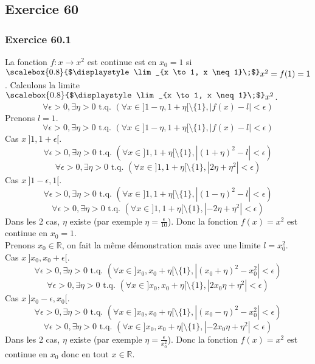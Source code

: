 \documentclass[]{book}
\theoremstyle{definition}
\newcommand{\bb}[1]{\mathbb{#1}}
\newcommand{\R}{\bb{R}}
\begin{document}
\subsection*{Exercice 60}
\subsubsection*{Exercice 60.1}
La fonction $f: x \to x^2$ est continue est en $x_0 = 1$ si $\raisebox{0.5ex}{\scalebox{0.8}{$\displaystyle \lim_{x \to 1, x \neq 1}\;$}} x^2 = f(1) = 1$.
Calculons la limite $\raisebox{0.5ex}{\scalebox{0.8}{$\displaystyle \lim_{x \to 1, x \neq 1}\;$}} x^2$.\\
$$\forall \epsilon >0, \exists \eta > 0 \textrm{ t.q. } ( \forall x \in ]1-\eta, 1+\eta[ \setminus \{1\}, |f(x)-l| <\epsilon)$$
Prenons $l=1$.
$$\forall \epsilon >0, \exists \eta > 0 \textrm{ t.q. } ( \forall x \in ]1-\eta, 1+\eta[ \setminus \{1\}, |f(x)-l| <\epsilon)$$
Cas $x \ ]1,1+\epsilon[$.
$$\forall \epsilon >0, \exists \eta > 0 \textrm{ t.q. } ( \forall x \in ]1, 1+\eta[ \setminus \{1\}, |(1+\eta)^2-l| <\epsilon)$$
$$\forall \epsilon >0, \exists \eta > 0 \textrm{ t.q. } ( \forall x \in ]1, 1+\eta[ \setminus \{1\}, |2\eta+\eta^2| <\epsilon)$$
Cas $x \ ]1-\epsilon,1[$.
$$\forall \epsilon >0, \exists \eta > 0 \textrm{ t.q. } ( \forall x \in ]1, 1+\eta[ \setminus \{1\}, |(1-\eta)^2-l| <\epsilon)$$
$$\forall \epsilon >0, \exists \eta > 0 \textrm{ t.q. } ( \forall x \in ]1, 1+\eta[ \setminus \{1\}, |-2\eta+\eta^2| <\epsilon)$$
Dans les 2 cas, $\eta$ existe (par exemple $\eta = \frac{\epsilon}{10}$). Donc la fonction $f(x)=x^2$ est continue en $x_0=1$.\\

Prenons $x_0 \in \R$, on fait la m\^eme d\'emonstration mais avec une limite $l=x_0^2$.\\ 
Cas $x \ ]x_0,x_0+\epsilon[$.
$$\forall \epsilon >0, \exists \eta > 0 \textrm{ t.q. } ( \forall x \in ]x_0, x_0+\eta[ \setminus \{1\}, |(x_0+\eta)^2-x_0^2| <\epsilon)$$
$$\forall \epsilon >0, \exists \eta > 0 \textrm{ t.q. } ( \forall x \in ]x_0, x_0+\eta[ \setminus \{1\}, |2x_0\eta+\eta^2| <\epsilon)$$
Cas $x \ ]x_0-\epsilon,x_0[$.
$$\forall \epsilon >0, \exists \eta > 0 \textrm{ t.q. } ( \forall x \in ]x_0, x_0+\eta[ \setminus \{1\}, |(x_0-\eta)^2-x_0^2| <\epsilon)$$
$$\forall \epsilon >0, \exists \eta > 0 \textrm{ t.q. } ( \forall x \in ]x_0, x_0+\eta[ \setminus \{1\}, |-2x_0\eta+\eta^2| <\epsilon)$$
Dans les 2 cas, $\eta$ existe (par exemple $\eta = \frac{\epsilon}{x_0^2}$). Donc la fonction $f(x)=x^2$ est continue en $x_0$ donc en tout $x\in\R$.\\
\end{document}

